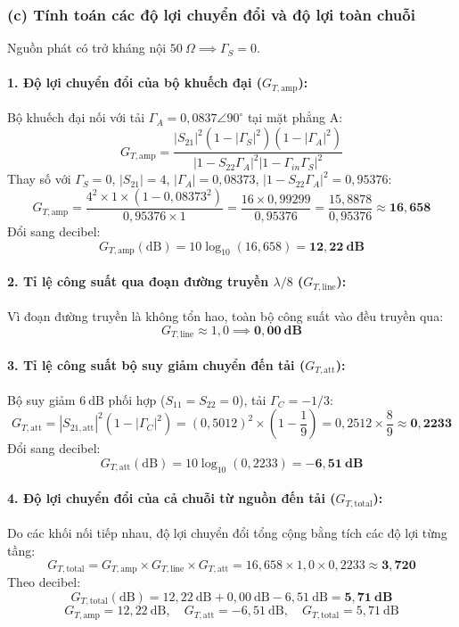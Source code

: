 \documentclass[12pt,a4paper]{article}
\begin{document}
\subsubsection{(c) Tính toán các độ lợi chuyển đổi và độ lợi toàn chuỗi}
Nguồn phát có trở kháng nội $50~\Omega \implies \Gamma_S = 0$.

\paragraph{1. Độ lợi chuyển đổi của bộ khuếch đại ($G_{T,\text{amp}}$):}
Bộ khuếch đại nối với tải $\Gamma_A = 0{,}0837\angle 90^\circ$ tại mặt phẳng A:
\[
G_{T,\text{amp}} = \frac{|S_{21}|^2 (1 - |\Gamma_S|^2)(1 - |\Gamma_A|^2)}{|1 - S_{22}\Gamma_A|^2 |1 - \Gamma_{in}\Gamma_S|^2}
\]
Thay số với $\Gamma_S = 0$, $|S_{21}| = 4$, $|\Gamma_A| = 0{,}08373$, $|1 - S_{22}\Gamma_A|^2 = 0{,}95376$:
\[
G_{T,\text{amp}} = \frac{4^2 \times 1 \times (1 - 0{,}08373^2)}{0{,}95376 \times 1} = \frac{16 \times 0{,}99299}{0{,}95376} = \frac{15{,}8878}{0{,}95376} \approx \mathbf{16{,}658}
\]
Đổi sang decibel:
\[
G_{T,\text{amp}}(\text{dB}) = 10 \log_{10}(16{,}658) = \mathbf{12{,}22~\text{dB}}
\]

\paragraph{2. Tỉ lệ công suất qua đoạn đường truyền $\lambda/8$ ($G_{T,\text{line}}$):}
Vì đoạn đường truyền là không tổn hao, toàn bộ công suất vào đều truyền qua:
\[
G_{T,\text{line}} \approx 1{,}0 \implies \mathbf{0{,}00~\text{dB}}
\]

\paragraph{3. Tỉ lệ công suất bộ suy giảm chuyển đến tải ($G_{T,\text{att}}$):}
Bộ suy giảm $6~\text{dB}$ phối hợp ($S_{11} = S_{22} = 0$), tải $\Gamma_C = -1/3$:
\[
G_{T,\text{att}} = |S_{21,\text{att}}|^2 (1 - |\Gamma_C|^2) = (0{,}5012)^2 \times \left(1 - \frac{1}{9}\right) = 0{,}2512 \times \frac{8}{9} \approx \mathbf{0{,}2233}
\]
Đổi sang decibel:
\[
G_{T,\text{att}}(\text{dB}) = 10 \log_{10}(0{,}2233) = \mathbf{-6{,}51~\text{dB}}
\]

\paragraph{4. Độ lợi chuyển đổi của cả chuỗi từ nguồn đến tải ($G_{T,\text{total}}$):}
Do các khối nối tiếp nhau, độ lợi chuyển đổi tổng cộng bằng tích các độ lợi từng tầng:
\[
G_{T,\text{total}} = G_{T,\text{amp}} \times G_{T,\text{line}} \times G_{T,\text{att}} = 16{,}658 \times 1{,}0 \times 0{,}2233 \approx \mathbf{3{,}720}
\]
Theo decibel:
\[
G_{T,\text{total}}(\text{dB}) = 12{,}22~\text{dB} + 0{,}00~\text{dB} - 6{,}51~\text{dB} = \mathbf{5{,}71~\text{dB}}
\]
\[
\boxed{G_{T,\text{amp}} = 12{,}22~\text{dB}, \quad G_{T,\text{att}} = -6{,}51~\text{dB}, \quad G_{T,\text{total}} = 5{,}71~\text{dB}}
\]
\end{document}
